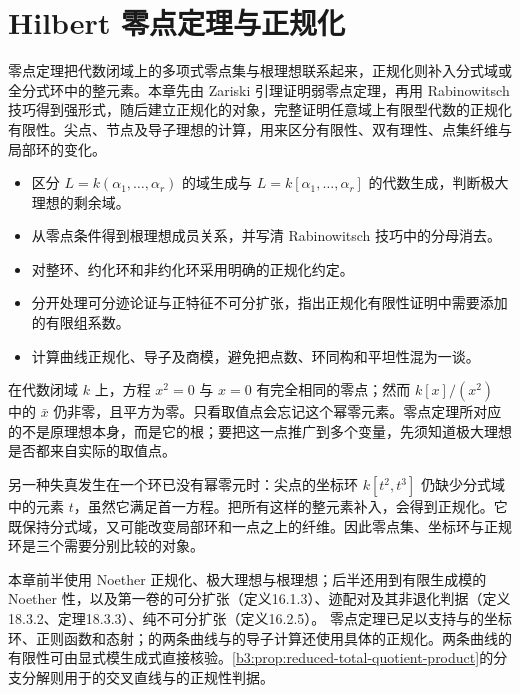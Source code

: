 
\chapter{Hilbert 零点定理与正规化}\label{b3:ch:06}

\begin{chapterabstract}
	零点定理把代数闭域上的多项式零点集与根理想联系起来，正规化则补入分式域或全分式环中的整元素。本章先由 Zariski 引理证明弱零点定理，再用 Rabinowitsch 技巧得到强形式，随后建立正规化的对象，完整证明任意域上有限型代数的正规化有限性。尖点、节点及导子理想的计算，用来区分有限性、双有理性、点集纤维与局部环的变化。
\end{chapterabstract}

\begin{learninggoals}
	\begin{itemize}
		\item 区分 \(L=k(\alpha_1,\ldots,\alpha_r)\) 的域生成与 \(L=k[\alpha_1,\ldots,\alpha_r]\) 的代数生成，判断极大理想的剩余域。
		\item 从零点条件得到根理想成员关系，并写清 Rabinowitsch 技巧中的分母消去。
		\item 对整环、约化环和非约化环采用明确的正规化约定。
		\item 分开处理可分迹论证与正特征不可分扩张，指出正规化有限性证明中需要添加的有限组系数。
		\item 计算曲线正规化、导子及商模，避免把点数、环同构和平坦性混为一谈。
	\end{itemize}
\end{learninggoals}

在代数闭域 \(k\) 上，方程 \(x^2=0\) 与 \(x=0\) 有完全相同的零点；然而 \(k[x]/(x^2)\) 中的 \(\bar x\) 仍非零，且平方为零。只看取值点会忘记这个幂零元素。零点定理所对应的不是原理想本身，而是它的根；要把这一点推广到多个变量，先须知道极大理想是否都来自实际的取值点。

\ProseParagraphBreak

另一种失真发生在一个环已没有幂零元时：尖点的坐标环 \(k[t^2,t^3]\) 仍缺少分式域中的元素 \(t\)，虽然它满足首一方程。把所有这样的整元素补入，会得到正规化。它既保持分式域，又可能改变局部环和一点之上的纤维。因此零点集、坐标环与正规环是三个需要分别比较的对象。

\ProseParagraphBreak

本章前半使用 Noether 正规化、极大理想与根理想；后半还用到有限生成模的 Noether 性，以及第一卷的可分扩张（定义16.1.3）、迹配对及其非退化判据（定义18.3.2、定理18.3.3）、纯不可分扩张（定义16.2.5）。 零点定理已足以支持与的坐标环、正则函数和态射；的两条曲线与的导子计算还使用具体的正规化。两条曲线的有限性可由显式模生成式直接核验。\cref{b3:prop:reduced-total-quotient-product}的分支分解则用于的交叉直线与的正规性判据。

